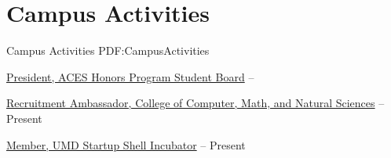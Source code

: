 
\section
{Campus Activities}
{Campus Activities}
{PDF:CampusActivities}

\BulletItem
\href{http://aces.umd.edu/}
{President,
ACES Honors Program Student Board}
\hfill
{} --

\GapNoBreak
\BulletItem
\href{https://cmns.umd.edu/undergraduate/admissions/recruitment-ambassadors}
{Recruitment Ambassador,
College of Computer, Math, and Natural Sciences}
\hfill
{} --
Present

\GapNoBreak
\BulletItem
\href{http://startupshell.org/}
{Member,
UMD Startup Shell Incubator}
\hfill
{} --
Present
\GapNoBreak
